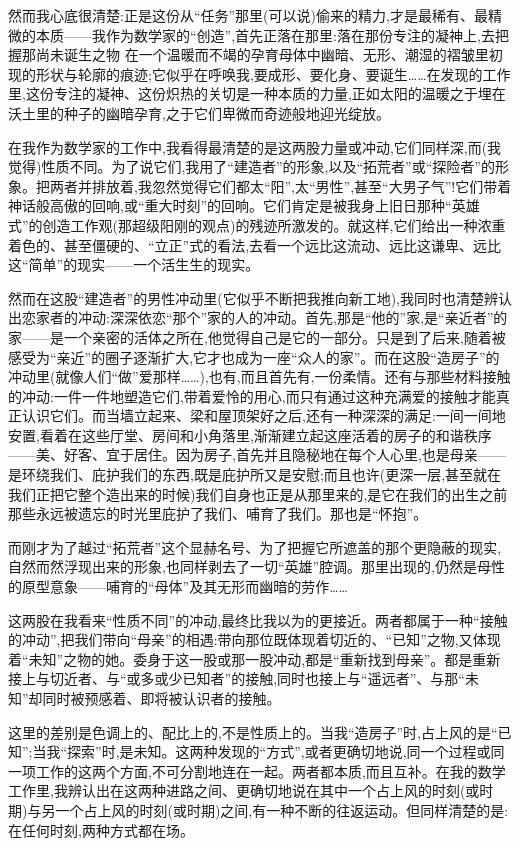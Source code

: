 然而我心底很清楚:正是这份从“任务”那里(可以说)偷来的精力,才是最稀有、最精微的本质——我作为数学家的“创造”,首先正落在那里:落在那份专注的凝神上,去把握那尚未诞生之物
 在一个温暖而不竭的孕育母体中幽暗、无形、潮湿的褶皱里初现的形状与轮廓的痕迹;它似乎在呼唤我,要成形、要化身、要诞生……在发现的工作里,这份专注的凝神、这份炽热的关切是一种本质的力量,正如太阳的温暖之于埋在沃土里的种子的幽暗孕育,之于它们卑微而奇迹般地迎光绽放。

在我作为数学家的工作中,我看得最清楚的是这两股力量或冲动,它们同样深,而(我觉得)性质不同。为了说它们,我用了“建造者”的形象,以及“拓荒者”或“探险者”的形象。把两者并排放着,我忽然觉得它们都太“阳”,太“男性”,甚至“大男子气”!它们带着神话般高傲的回响,或“重大时刻”的回响。它们肯定是被我身上旧日那种“英雄式”的创造工作观(那超级阳刚的观点)的残迹所激发的。就这样,它们给出一种浓重着色的、甚至僵硬的、“立正”式的看法,去看一个远比这流动、远比这谦卑、远比这“简单”的现实——一个活生生的现实。

然而在这股“建造者”的男性冲动里(它似乎不断把我推向新工地),我同时也清楚辨认出恋家者的冲动:深深依恋“那个”家的人的冲动。首先,那是“他的”家,是“亲近者”的家——是一个亲密的活体之所在,他觉得自己是它的一部分。只是到了后来,随着被感受为“亲近”的圈子逐渐扩大,它才也成为一座“众人的家”。而在这股“造房子”的冲动里(就像人们“做”爱那样……),也有,而且首先有,一份柔情。还有与那些材料接触的冲动:一件一件地塑造它们,带着爱怜的用心,而只有通过这种充满爱的接触才能真正认识它们。而当墙立起来、梁和屋顶架好之后,还有一种深深的满足:一间一间地安置,看着在这些厅堂、房间和小角落里,渐渐建立起这座活着的房子的和谐秩序——美、好客、宜于居住。因为房子,首先并且隐秘地在每个人心里,也是母亲——是环绕我们、庇护我们的东西,既是庇护所又是安慰;而且也许(更深一层,甚至就在我们正把它整个造出来的时候)我们自身也正是从那里来的,是它在我们的出生之前那些永远被遗忘的时光里庇护了我们、哺育了我们。那也是“怀抱”。

而刚才为了越过“拓荒者”这个显赫名号、为了把握它所遮盖的那个更隐蔽的现实,自然而然浮现出来的形象,也同样剥去了一切“英雄”腔调。那里出现的,仍然是母性的原型意象——哺育的“母体”及其无形而幽暗的劳作……

这两股在我看来“性质不同”的冲动,最终比我以为的更接近。两者都属于一种“接触的冲动”,把我们带向“母亲”的相遇:带向那位既体现着切近的、“已知”之物,又体现着“未知”之物的她。委身于这一股或那一股冲动,都是“重新找到母亲”。都是重新接上与切近者、与“或多或少已知者”的接触,同时也接上与“遥远者”、与那“未知”却同时被预感着、即将被认识者的接触。

这里的差别是色调上的、配比上的,不是性质上的。当我“造房子”时,占上风的是“已知”;当我“探索”时,是未知。这两种发现的“方式”,或者更确切地说,同一个过程或同一项工作的这两个方面,不可分割地连在一起。两者都本质,而且互补。在我的数学工作里,我辨认出在这两种进路之间、更确切地说在其中一个占上风的时刻(或时期)与另一个占上风的时刻(或时期)之间,有一种不断的往返运动。但同样清楚的是:在任何时刻,两种方式都在场。

